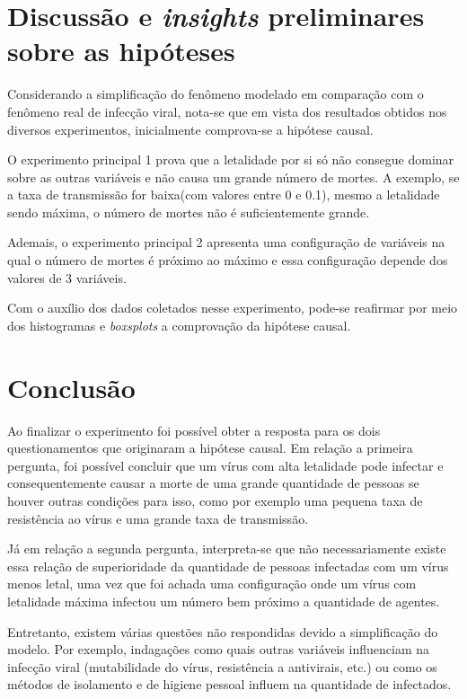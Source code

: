 \section{Discussão e \textit{insights} preliminares sobre as hipóteses}

Considerando a simplificação do fenômeno modelado em comparação com o fenômeno real de infecção viral, nota-se que em vista dos resultados obtidos nos diversos experimentos, inicialmente comprova-se a hipótese causal. 

O experimento principal 1 prova que a letalidade por si só não consegue dominar sobre as outras variáveis e não causa um grande número de mortes. A exemplo, se a taxa de transmissão for baixa(com valores entre 0 e 0.1), mesmo a letalidade sendo máxima, o número de mortes não é suficientemente grande.

Ademais, o experimento principal 2 apresenta uma configuração de variáveis na qual o número de mortes é próximo ao máximo e essa configuração depende dos valores de 3 variáveis.

Com o auxílio dos dados coletados nesse experimento, pode-se reafirmar por meio dos histogramas e \textit{boxsplots} a comprovação da hipótese causal. 

\section{Conclusão}

Ao finalizar o experimento foi possível obter a resposta para os dois questionamentos que originaram a hipótese causal. Em relação a primeira pergunta, foi possível concluir que um vírus com alta letalidade pode infectar e consequentemente causar a morte de uma grande quantidade de pessoas se houver outras condições para isso, como por exemplo uma pequena taxa de resistência ao vírus e uma grande taxa de transmissão.

Já em relação a segunda pergunta, interpreta-se que não necessariamente existe essa relação de superioridade da quantidade de pessoas infectadas com um vírus menos letal, uma vez que foi achada uma configuração onde um vírus com letalidade máxima infectou um número bem próximo a quantidade de agentes. 

Entretanto, existem várias questões não respondidas devido a simplificação do modelo. Por exemplo, indagações como quais outras variáveis influenciam na infecção viral (mutabilidade do vírus, resistência a antivirais, etc.) ou como os métodos de isolamento e de higiene pessoal influem na quantidade de infectados.   